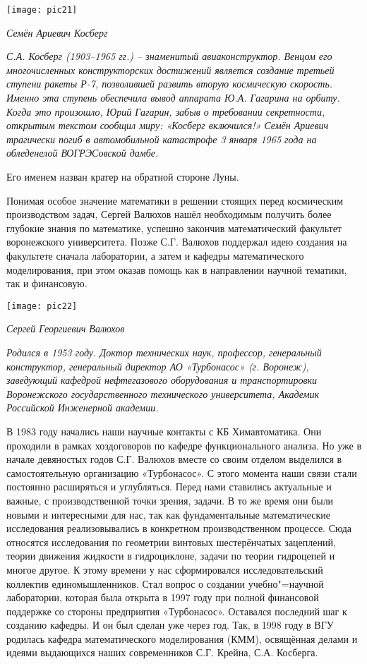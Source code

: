 \begin{center}

\texttt{[image: pic21]}


{\it Семён Ариевич Косберг}
\end{center}

{\it С.А. Косберг (1903–1965 гг.) – знаменитый авиаконструктор. Венцом его многочисленных конструкторских достижений является создание третьей ступени ракеты Р-7, позволившей развить вторую космическую скорость. Именно эта ступень обеспечила вывод аппарата Ю.А. Гагарина на орбиту. Когда это произошло, Юрий Гагарин, забыв о требовании секретности, открытым текстом сообщил миру: «Косберг включился!» Семён Ариевич трагически погиб в автомобильной катастрофе 3 января 1965 года на обледенелой ВОГРЭСовской дамбе.

Его именем назван кратер на обратной стороне Луны.
}

Понимая особое значение математики в решении стоящих перед космическим производством задач, Сергей Валюхов нашёл необходимым получить более глубокие знания по математике, успешно закончив математический факультет воронежского университета.
 Позже С.Г. Валюхов поддержал идею создания на факультете сначала лаборатории, а затем и кафедры математического моделирования, при этом оказав помощь как в направлении научной тематики, так и финансовую.


\begin{center}

\texttt{[image: pic22]}


{\it Сергей Георгиевич Валюхов}
\end{center}

{\it Родился в 1953 году. Доктор технических наук, профессор, генеральный конструктор, генеральный директор АО «Турбонасос» (г. Воронеж), заведующий кафедрой нефтегазового оборудования и транспортировки Воронежского государственного технического университета, Академик Российской Инженерной академии.}

В 1983 году начались наши научные контакты с КБ Химавтоматика. Они проходили в рамках хоздоговоров по кафедре функционального анализа. Но уже в начале девяностых годов С.Г. Валюхов вместе со своим отделом выделился в самостоятельную организацию «Турбонасос».  С этого момента наши связи стали постоянно расширяться и углубляться. Перед нами ставились актуальные и важные, с производственной точки зрения, задачи. В то же время они были новыми и интересными для нас, так как фундаментальные математические исследования реализовывались в конкретном производственном процессе. Сюда относятся исследования по геометрии винтовых шестерёнчатых зацеплений, теории движения жидкости в гидроциклоне, задачи по теории гидроцепей и многое другое.
К этому времени у нас сформировался исследовательский коллектив единомышленников. Стал вопрос о создании учебно"=научной лаборатории, которая была открыта в 1997 году при полной финансовой поддержке со стороны предприятия «Турбонасос». Оставался последний шаг к созданию кафедры. И он был сделан уже через год. Так, в 1998 году в ВГУ родилась кафедра математического моделирования (КММ), освящённая делами и идеями выдающихся наших современников С.Г. Крейна, С.А. Косберга.

